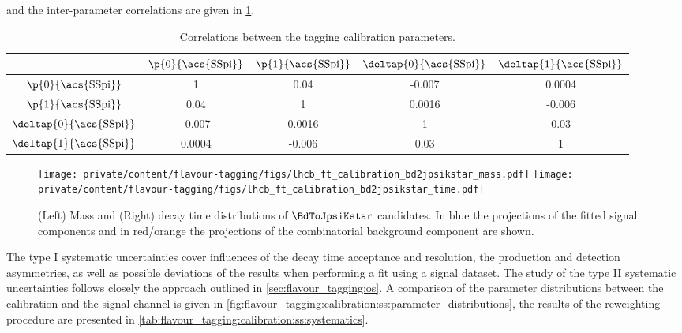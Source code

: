 %
and the inter-parameter correlations are given in
\cref{tab:flavour_tagging:calibration:ss:correlations}.
%
\begin{table}
  \centering
  \caption{Correlations between the \SSpi tagging calibration parameters.}
  \label{tab:flavour_tagging:calibration:ss:correlations}
  \begin{tabular}{ccccc}
    \toprule
    & $\p{0}{\text{\acs{SSpi}}}$ & $\p{1}{\text{\acs{SSpi}}}$ & $\deltap{0}{\text{\acs{SSpi}}}$ & $\deltap{1}{\text{\acs{SSpi}}}$ \\
    \midrule
    $\p{0}{\text{\acs{SSpi}}}$ & 1 & 0.04 & -0.007 & 0.0004 \\
    $\p{1}{\text{\acs{SSpi}}}$ & 0.04 & 1 & 0.0016 & -0.006 \\
    $\deltap{0}{\text{\acs{SSpi}}}$ & -0.007 & 0.0016 & 1 & 0.03 \\
    $\deltap{1}{\text{\acs{SSpi}}}$ & 0.0004 & -0.006 & 0.03 & 1 \\
    \bottomrule
  \end{tabular}
\end{table}
%
\begin{figure}[t]
  \texttt{[image: private/content/flavour-tagging/figs/lhcb\_ft\_calibration\_bd2jpsikstar\_mass.pdf]}
  \texttt{[image: private/content/flavour-tagging/figs/lhcb\_ft\_calibration\_bd2jpsikstar\_time.pdf]}
  \caption{(Left) Mass and (Right) decay time distributions of $\BdToJpsiKstar$
  candidates. In blue the projections of the fitted signal components and in
  red/orange the projections of the combinatorial background component are
  shown. \cite{FT:RunI}}
  \label{fig:flavour_tagging:calibration:ss:fit}
\end{figure}
%
The type I systematic uncertainties cover influences of the decay time
acceptance and resolution, the production and detection asymmetries, as well as
possible deviations of the results when performing a fit using a signal
\sweighted dataset. The study of the type II systematic uncertainties follows
closely the approach outlined in \cref{sec:flavour_tagging:os}. A comparison of
the parameter distributions between the calibration and the signal channel is
given in \cref{fig:flavour_tagging:calibration:ss:parameter_distributions}, the
results of the reweighting procedure are presented in
\cref{tab:flavour_tagging:calibration:ss:systematics}.
%
